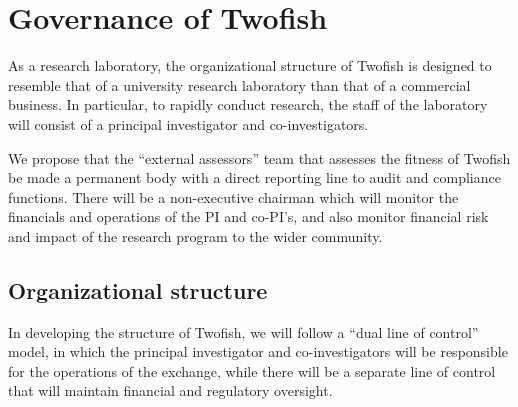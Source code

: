 \section{Governance of Twofish}

As a research laboratory, the organizational structure of Twofish is
designed to resemble that of a university research laboratory than that
of a commercial business.  In particular, to rapidly conduct
research, the staff of the laboratory will consist of a principal
investigator and co-investigators.

We propose that the ``external assessors'' team that assesses the
fitness of Twofish be made a permanent body with a direct reporting
line to audit and compliance functions.  There will be a non-executive
chairman which will monitor the financials and operations of the PI
and co-PI's, and also monitor financial risk and impact of the
research program to the wider community.

\subsection{Organizational structure}
In developing the structure of Twofish, we will follow a ``dual line
of control'' model, in which the principal investigator and
co-investigators will be responsible for the operations of the
exchange, while there will be a separate line of control that will
maintain financial and regulatory oversight.

